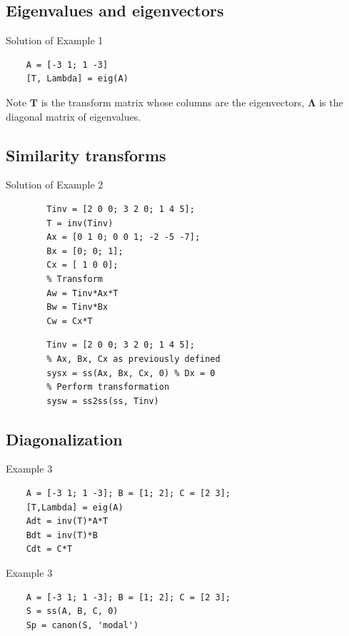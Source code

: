 \subsection*{Eigenvalues and eigenvectors}

\begin{slide}
   Solution of Example 1
   \begin{verbatim}
	A = [-3 1; 1 -3]
	[T, Lambda] = eig(A)
   \end{verbatim}
	Note $\mathbf{T}$ is the transform matrix whose columns are the eigenvectors, $\mathbf{\Lambda}$ is the diagonal matrix of eigenvalues.
\end{slide}

\subsection*{Similarity transforms}

\begin{slide}
	Solution of Example 2
	\begin{verbatim}
		Tinv = [2 0 0; 3 2 0; 1 4 5];
		T = inv(Tinv)
		Ax = [0 1 0; 0 0 1; -2 -5 -7];
		Bx = [0; 0; 1];
		Cx = [ 1 0 0];
		% Transform
		Aw = Tinv*Ax*T
		Bw = Tinv*Bx
		Cw = Cx*T
	\end{verbatim}
\end{slide}

\begin{slide}
	\begin{verbatim}
		Tinv = [2 0 0; 3 2 0; 1 4 5];
		% Ax, Bx, Cx as previously defined
		sysx = ss(Ax, Bx, Cx, 0) % Dx = 0
		% Perform transformation
		sysw = ss2ss(ss, Tinv)
	\end{verbatim}
\end{slide}


\subsection{Diagonalization}

\begin{slide}
Example 3
\begin{verbatim}
	A = [-3 1; 1 -3]; B = [1; 2]; C = [2 3];
	[T,Lambda] = eig(A)
	Adt = inv(T)*A*T
	Bdt = inv(T)*B
	Cdt = C*T
\end{verbatim}
\end{slide}

\begin{slide}
Example 3
\begin{verbatim}
	A = [-3 1; 1 -3]; B = [1; 2]; C = [2 3];
	S = ss(A, B, C, 0)
	Sp = canon(S, 'modal')
\end{verbatim}
\end{slide}



\endinput


